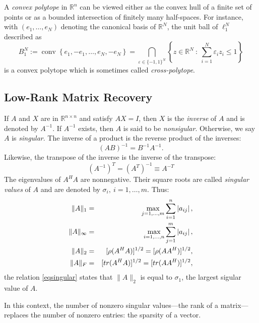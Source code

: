 A \emph{\textcolor[rgb]{1,0,0}{convex polytope}} in $\mathbb{R}^n$ can be viewed either as the convex hull of a finite set of points or as a bounded intersection of finitely many half-spaces. For instance, with $(e_1,\dots,e_N)$ denoting the canonical basis of $\mathbb{R}^N$, the unit ball of $\ell_1^N$ described as 
\[
    B_1^N := \mathop{\mathrm{conv}} \left\{ e_1, -e_1,\dots,e_N,-e_N \right\} = \bigcap\limits_{\varepsilon \in \{-1,1\}^N} \left\{ z \in \mathbb{R}^N\ :\ \sum\limits_{i = 1}^{N} \varepsilon_i z_i \leq 1 \right\}
\]
is a convex polytope which is sometimes called \emph{\textcolor[rgb]{1,0,0}{cross-polytope}}. 


\subsection{Low-Rank Matrix Recovery}
\begin{mdframed}
    \label{singular}
    If $A$ and $X$ are in $\mathbb{R}^{n \times n}$ and satisfy $AX=I$, then $X$ is the \emph{inverse} of $A$ and is denoted by $A^{-1}$. If $A^{-1}$ exists, then $A$ is said to be \emph{\textcolor[rgb]{1,0,0}{nonsigular}}. Otherwise, we say $A$ is \emph{\textcolor[rgb]{1,0,0}{singular}}. The inverse of a product is the reverse product of the inverses:
    \[
        (AB)^{-1} = B^{-1}A^{-1}.
    \]
    Likewise, the transpose of the inverse is the inverse of the transpose:
    \[
        (A^{-1})^T = (A^T)^{-1} \equiv A^{-T}
    \]
    The eigenvalues of $A^H A$ are nonnegative. Their square roots are called \emph{\textcolor[rgb]{1,0,0}{singular values}} of $A$ and are denoted by $\sigma_i,\ i=1,\dots,m$. Thus:
    \begin{eqnarray}
        \|A\|_1 &=& \max\limits_{j = 1, \dots, m}^{}\sum\limits_{i = 1}^{n}\left|a_{ij}\right|, \notag \\
        \|A\|_{\infty} &=& \max\limits_{i = 1, \dots, n}^{} \sum\limits_{j=1}^{m}\left|a_{ij}\right|, \notag \\
        \|A\|_2 &=&  [\rho(A^HA)]^{1/2} = [\rho(AA^H)]^{1/2} , \\
        \|A\|_F &=& [tr(A^HA)]^{1/2} = [tr(AA^H)]^{1/2}, \notag
        \label{eqsingular}
    \end{eqnarray}
    the relation \cref{eqsingular} states that $\|A\|_2$ is equal to $\sigma_1$, the largest sigular value of $A$.
\end{mdframed}
In this context, the number of nonzero singular values---the rank of a matrix---replaces the number of nonzero entries: the sparsity of a vector.

